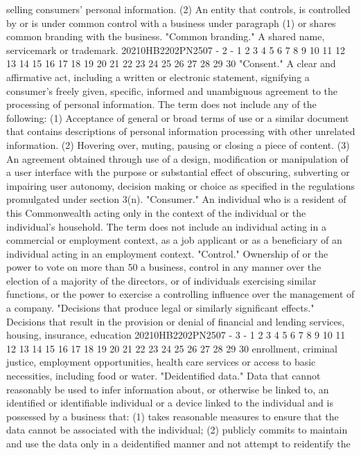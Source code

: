 selling consumers' personal information.
(2) An entity that controls, is controlled by or is
under common control with a business under paragraph (1) or
shares common branding with the business.
"Common branding." A shared name, servicemark or trademark.
20210HB2202PN2507 - 2 -
1
2
3
4
5
6
7
8
9
10
11
12
13
14
15
16
17
18
19
20
21
22
23
24
25
26
27
28
29
30
"Consent." A clear and affirmative act, including a written
or electronic statement, signifying a consumer's freely given,
specific, informed and unambiguous agreement to the processing
of personal information. The term does not include any of the
following:
(1) Acceptance of general or broad terms of use or a
similar document that contains descriptions of personal
information processing with other unrelated information.
(2) Hovering over, muting, pausing or closing a piece of
content.
(3) An agreement obtained through use of a design,
modification or manipulation of a user interface with the
purpose or substantial effect of obscuring, subverting or
impairing user autonomy, decision making or choice as
specified in the regulations promulgated under section 3(n).
"Consumer." An individual who is a resident of this
Commonwealth acting only in the context of the individual or the
individual's household. The term does not include an individual
acting in a commercial or employment context, as a job applicant
or as a beneficiary of an individual acting in an employment
context.
"Control." Ownership of or the power to vote on more than
50%
a business, control in any manner over the election of a
majority of the directors, or of individuals exercising similar
functions, or the power to exercise a controlling influence over
the management of a company.
"Decisions that produce legal or similarly significant
effects." Decisions that result in the provision or denial of
financial and lending services, housing, insurance, education
20210HB2202PN2507 - 3 -
1
2
3
4
5
6
7
8
9
10
11
12
13
14
15
16
17
18
19
20
21
22
23
24
25
26
27
28
29
30
enrollment, criminal justice, employment opportunities, health
care services or access to basic necessities, including food or
water.
"Deidentified data." Data that cannot reasonably be used to
infer information about, or otherwise be linked to, an
identified or identifiable individual or a device linked to the
individual and is possessed by a business that:
(1) takes reasonable measures to ensure that the data
cannot be associated with the individual;
(2) publicly commits to maintain and use the data only
in a deidentified manner and not attempt to reidentify the
